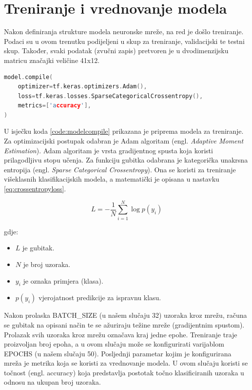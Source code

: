 \section{Treniranje i vrednovanje modela}
\label{sec:training}

Nakon definiranja strukture modela neuronske mreže, na red je došlo treniranje. Podaci 
su u ovom trenutku podijeljeni u skup za treniranje, validacijski te testni skup. Također,
svaki podatak (zvučni zapis) pretvoren je u dvodimenzijsku matricu značajki veličine 41x12.


\begin{lstlisting}[language=C++, caption=Konfiguracija za treniranje, label=code:modelcompile]
model.compile(
    optimizer=tf.keras.optimizers.Adam(),
    loss=tf.keras.losses.SparseCategoricalCrossentropy(),
    metrics=['accuracy'],
)
\end{lstlisting}

U isječku koda \ref{code:modelcompile} prikazana je priprema modela za treniranje.
Za optimizacijski postupak odabran je Adam algoritam (engl. \textit{Adaptive Moment Estimation}).
Adam algoritam je vrsta gradijentnog spusta koja koristi prilagodljivu stopu učenja.
Za funkciju gubitka odabrana je kategorička unakrsna entropija (engl. \textit{Sparse Categorical
Crossentropy}). Ona se koristi za treniranje višeklasnih klasifikacijskih modela, a
matematički je opisana u nastavku \ref{eq:crossentropyloss}.

\begin{equation}
    \label{eq:crossentropyloss}
    L = - \frac{1}{N} \sum_{i=1}^{N} \log p(y_i)
\end{equation}

gdje:
\begin{itemize}
    \item \( L \) je gubitak.
    \item \( N \) je broj uzoraka.
    \item \( y_i \) je oznaka primjera (klasa).
    \item \( p(y_i) \) vjerojatnost predikcije za ispravnu klasu.
\end{itemize}

Nakon prolaska BATCH\_SIZE (u našem slučaju 32) uzoraka kroz mrežu, računa se
gubitak na opisani način te se ažuriraju težine mreže (gradijentnim spustom).
Prolazak svih uzoraka kroz mrežu označava kraj jedne epohe. Treniranje traje 
proizvoljan broj epoha, a u ovom slučaju može se konfigurirati varijablom EPOCHS
(u našem slučaju 50).
Posljednji parametar kojim je konfigurirana mreža je metrika koja se koristi za
vrednovanje modela. U ovom slučaju koristi se točnost (engl. accuracy) koja
predstavlja postotak točno klasificiranih uzoraka u odnosu na ukupan broj uzoraka.

